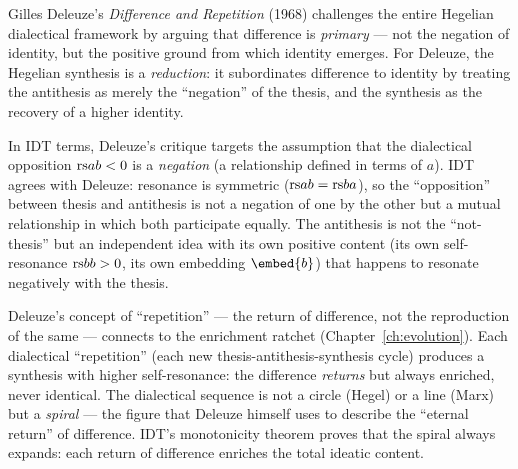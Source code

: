 \begin{interpretation}
\label{interp:ch16:deleuze_difference_repetition}
Gilles Deleuze's \textit{Difference and Repetition} (1968) challenges the
entire Hegelian dialectical framework by arguing that difference is
\emph{primary} --- not the negation of identity, but the positive ground
from which identity emerges.  For Deleuze, the Hegelian synthesis is a
\emph{reduction}: it subordinates difference to identity by treating the
antithesis as merely the ``negation'' of the thesis, and the synthesis as
the recovery of a higher identity.

In IDT terms, Deleuze's critique targets the assumption that the dialectical
opposition $\mathrm{rs}{a}{b} < 0$ is a \emph{negation} (a relationship defined in
terms of $a$).  IDT agrees with Deleuze: resonance is symmetric
($\mathrm{rs}{a}{b} = \mathrm{rs}{b}{a}$), so the ``opposition'' between thesis and
antithesis is not a negation of one by the other but a mutual relationship
in which both participate equally.  The antithesis is not the ``not-thesis''
but an independent idea with its own positive content (its own self-resonance
$\mathrm{rs}{b}{b} > 0$, its own embedding $\embed{b}$) that happens to resonate
negatively with the thesis.

Deleuze's concept of ``repetition'' --- the return of difference, not the
reproduction of the same --- connects to the enrichment ratchet
(Chapter~\ref{ch:evolution}).  Each dialectical ``repetition'' (each new
thesis-antithesis-synthesis cycle) produces a synthesis with higher
self-resonance: the difference \emph{returns} but always enriched, never
identical.  The dialectical sequence is not a circle (Hegel) or a line
(Marx) but a \emph{spiral} --- the figure that Deleuze himself uses to
describe the ``eternal return'' of difference.  IDT's monotonicity theorem
proves that the spiral always expands: each return of difference enriches
the total ideatic content.
\end{interpretation}

